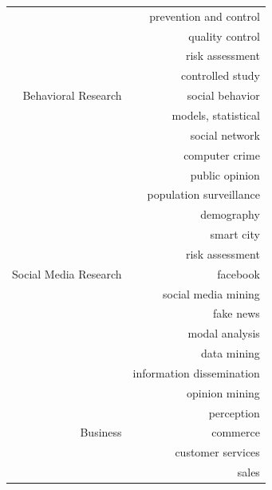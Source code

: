 \begin{center}
\begin{longtable}{ rr }
                              & prevention and control          \\
                              & quality control                 \\
                              & risk assessment                 \\
                              & controlled study                \\
        \hline
        Behavioral Research   & social behavior                 \\
                              & models, statistical             \\
                              & social network                  \\
                              & computer crime                  \\
                              & public opinion                  \\
                              & population surveillance         \\
                              & demography                      \\
                              & smart city                      \\
                              & risk assessment                 \\
        \hline
        Social Media Research & facebook                        \\
                              & social media mining             \\
                              & fake news                       \\
                              & modal analysis                  \\
                              & data mining                     \\
                              & information dissemination       \\
                              & opinion mining                  \\
                              & perception                      \\
        \hline
        Business              & commerce                        \\
                              & customer services               \\
                              & sales                           \\

\end{longtable}
\end{center}
